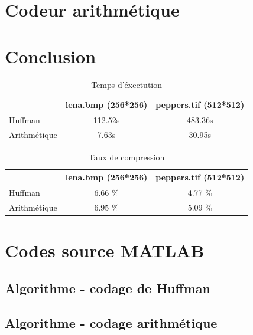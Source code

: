 \documentclass[a4paper, 12pt]{article}
\newcommand{\FSource}[1]{%

}
\begin{document}
\section{Codeur arithmétique}

\section{Conclusion}

\begin{table}[!h]
	\centering
		\begin{tabular}{l|c | c|}
			\cline{2-3}
			                                   & lena.bmp (256*256) & peppers.tif (512*512) \\
			\hline
			\multicolumn{1}{|l|}{Huffman}      & 112.52s            & 483.36s               \\
			\hline
			\multicolumn{1}{|l|}{Arithmétique} & 7.63s              & 30.95s                \\
			\hline
		\end{tabular}
	\caption{Temps d'éxectution}
	\label{tab:TableTempsExec}
\end{table}

\begin{table}[!h]
	\centering
		\begin{tabular}{l|c | c|}
			\cline{2-3}
			                                   & lena.bmp (256*256) & peppers.tif (512*512) \\
			\hline
			\multicolumn{1}{|l|}{Huffman}      & 6.66 \%            & 4.77 \%               \\
			\hline
			\multicolumn{1}{|l|}{Arithmétique} & 6.95 \%            & 5.09 \%               \\
			\hline
		\end{tabular}
	\caption{Taux de compression}
	\label{tab:TableTauxCompress}
\end{table}

\clearpage
\appendix

\section{Codes source MATLAB}
\subsection{Algorithme - codage de Huffman}\label{algohuffman}

\FSource{../huffman.m}

\newpage
\subsection{Algorithme - codage arithmétique}\label{algoarithmetique}

\FSource{../arith.m}
\end{document}
